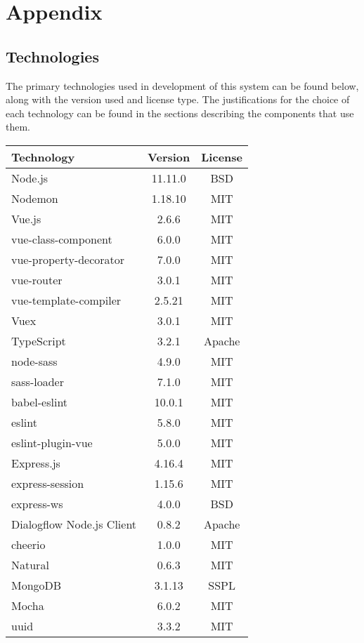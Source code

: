 \section{Appendix}

\subsection{Technologies}
The primary technologies used in development of this system can be found below, along with the version used and license type. The justifications for the choice of each technology can be found in the sections describing the components that use them.

\begin{center}
	\begin{tabular}{ | l | c | c | } 
		\hline
		\textbf{Technology} & \textbf{Version} & \textbf{License} \\ 
		\hline
		Node.js & 11.11.0 & BSD \\
		Nodemon & 1.18.10 & MIT \\
        Vue.js & 2.6.6 & MIT \\
        vue-class-component & 6.0.0 & MIT \\
        vue-property-decorator & 7.0.0 & MIT \\
        vue-router & 3.0.1 & MIT \\
        vue-template-compiler & 2.5.21 & MIT \\
        Vuex & 3.0.1 & MIT \\
        TypeScript & 3.2.1 & Apache \\
        node-sass & 4.9.0 & MIT \\
        sass-loader & 7.1.0 & MIT \\
        babel-eslint & 10.0.1 & MIT \\
        eslint & 5.8.0 & MIT \\
        eslint-plugin-vue & 5.0.0 & MIT \\
		Express.js & 4.16.4 & MIT \\
		express-session & 1.15.6 & MIT \\
		express-ws & 4.0.0 & BSD \\
		Dialogflow Node.js Client & 0.8.2 & Apache \\
        cheerio & 1.0.0 & MIT \\
        Natural & 0.6.3 & MIT \\
		MongoDB & 3.1.13 & SSPL \\
		Mocha & 6.0.2 & MIT \\
		uuid & 3.3.2 & MIT \\
		\hline
	\end{tabular}
\end{center}

